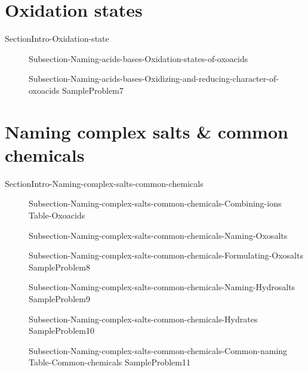 \documentclass[main.tex]{subfiles}
\newcommand\chapterlabel{Ch-naming}\setcounter{figurenewcounter}{0}\setcounter{tablenewcounter}{0}\setcounter{formulanewcounter}{0}\chapterpicture{../{\chapterlabel}/figure1}\chapterpicturelabel{Pixnio}
\begin{document}
\section{Oxidation states}
{SectionIntro-Oxidation-state}

\sloppy \begin{description}
\item[] {Subsection-Naming-acids-bases-Oxidation-states-of-oxoacids}
\item[] {Subsection-Naming-acids-bases-Oxidizing-and-reducing-character-of-oxoacids}
{SampleProblem7}
\end{description}

\section{Naming complex salts  \& common chemicals}
{SectionIntro-Naming-complex-salts-common-chemicals}
\sloppy \begin{description}
\item[] {Subsection-Naming-complex-salts-common-chemicals-Combining-ions}
 {Table-Oxoacids}
\item[]{Subsection-Naming-complex-salts-common-chemicals-Naming-Oxosalts}
\item[] {Subsection-Naming-complex-salts-common-chemicals-Formulating-Oxosalts}
{SampleProblem8}
\item[] {Subsection-Naming-complex-salts-common-chemicals-Naming-Hydrosalts}
{SampleProblem9}
\item[] {Subsection-Naming-complex-salts-common-chemicals-Hydrates}
{SampleProblem10}
\item[] {Subsection-Naming-complex-salts-common-chemicals-Common-naming}
{Table-Common-chemicals}	
 {SampleProblem11}
\end{description}
\end{document}
